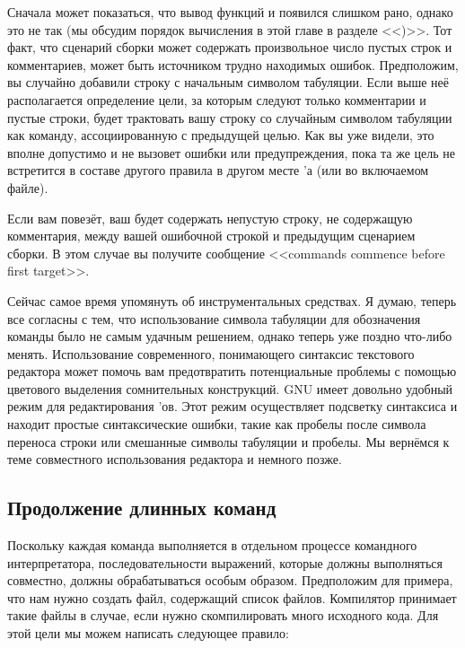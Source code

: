 Сначала может показаться, что вывод функций  и
 появился слишком рано, однако это не так (мы обсудим
порядок вычисления в этой главе в разделе
<<)>>. Тот факт, что сценарий сборки
может содержать произвольное число пустых строк и комментариев, может
быть источником трудно находимых ошибок.  Предположим, вы случайно
добавили строку с начальным символом табуляции.  Если выше неё
располагается определение цели, за которым следуют только комментарии
и пустые строки, \GNUmake{} будет трактовать вашу строку со случайным
символом табуляции как команду, ассоциированную с предыдущей целью.
Как вы уже видели, это вполне допустимо и не вызовет ошибки или
предупреждения, пока та же цель не встретится в составе другого
правила в другом месте \Makefile{}'а (или во включаемом файле).

Если вам повезёт, ваш \Makefile{} будет содержать непустую строку, не
содержащую комментария, между вашей ошибочной строкой и предыдущим
сценарием сборки. В этом случае вы получите сообщение <<commands
commence before first target>>.

Сейчас самое время упомянуть об инструментальных средствах. Я думаю,
теперь все согласны с тем, что использование символа табуляции для
обозначения команды было не самым удачным решением, однако теперь уже
поздно что-либо менять. Использование современного, понимающего
синтаксис текстового редактора может помочь вам предотвратить
потенциальные проблемы с помощью цветового выделения сомнительных
конструкций. GNU  имеет довольно удобный режим для
редактирования \Makefile{}'ов. Этот режим осуществляет подсветку
синтаксиса и находит простые синтаксические ошибки, такие как пробелы
после символа переноса строки или смешанные символы табуляции и
пробелы. Мы вернёмся к теме совместного использования редактора
 и \GNUmake{} немного позже.

\subsection{Продолжение длинных команд}

Поскольку каждая команда выполняется в отдельном процессе командного
интерпретатора, последовательности выражений, которые должны
выполняться совместно, должны обрабатываться особым образом.
Предположим для примера, что нам нужно создать файл, содержащий список
файлов. Компилятор \Java{} принимает такие файлы в случае, если нужно
скомпилировать много исходного кода. Для этой цели мы можем написать
следующее правило:

